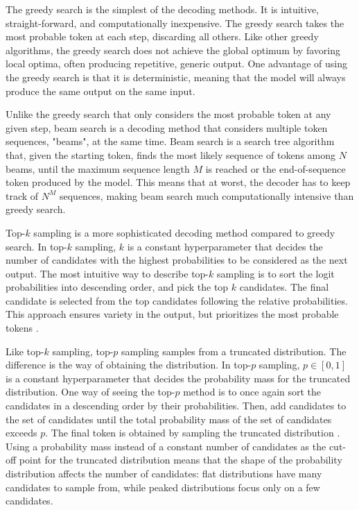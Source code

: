 \documentclass[english, 12pt, a4paper, sci, utf8, a-2b, online]{../definitions/aaltothesis}
\begin{document}
The greedy search is the simplest of the decoding methods. It is intuitive, straight-forward, and computationally inexpensive. The greedy search takes the most probable token at each step, discarding all others. Like other greedy algorithms, the greedy search does not achieve the global optimum by favoring local optima, often producing repetitive, generic output. One advantage of using the greedy search is that it is deterministic, meaning that the model will always produce the same output on the same input.

Unlike the greedy search that only considers the most probable token at any given step, beam search is a decoding method that considers multiple token sequences, "beams", at the same time. Beam search is a search tree algorithm that, given the starting token, finds the most likely sequence of tokens among $N$ beams, until the maximum sequence length $M$ is reached or the end-of-sequence token produced by the model. This means that at worst, the decoder has to keep track of $N^M$ sequences, making beam search much computationally intensive than greedy search. 

Top-$k$ sampling is a more sophisticated decoding method compared to greedy search. In top-$k$ sampling, $k$ is a constant hyperparameter that decides the number of candidates with the highest probabilities to be considered as the next output. The most intuitive way to describe top-$k$ sampling is to sort the logit probabilities into descending order, and pick the top $k$ candidates. The final candidate is selected from the top candidates following the relative probabilities. This approach ensures variety in the output, but prioritizes the most probable tokens \cite{holtzman2020curiouscaseneuraltext}.

Like top-$k$ sampling, top-$p$ sampling samples from a truncated distribution. The difference is the way of obtaining the distribution. In top-$p$ sampling, $p \in [0, 1]$ is a constant hyperparameter that decides the probability mass for the truncated distribution. One way of seeing the top-$p$ method is to once again sort the candidates in a descending order by their probabilities. Then, add candidates to the set of candidates until the total probability mass of the set of candidates exceeds $p$. The final token is obtained by sampling the truncated distribution \cite{holtzman2020curiouscaseneuraltext}. Using a probability mass instead of a constant number of candidates as the cut-off point for the truncated distribution means that the shape of the probability distribution affects the number of candidates: flat distributions have many candidates to sample from, while peaked distributions focus only on a few candidates.
\end{document}
